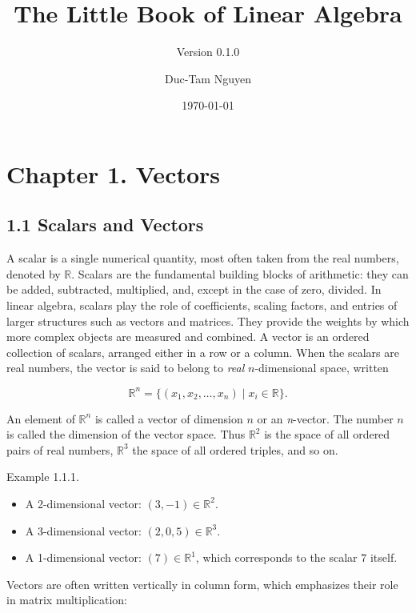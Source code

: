 \documentclass[
  12pt,
  a4paper,
]{article}
\title{The Little Book of Linear Algebra}
\subtitle{Version 0.1.0}
\author{Duc-Tam Nguyen}
\date{\today}
\let\oldsection\section
\renewcommand{\section}{\clearpage\oldsection}
\begin{document}
\maketitle

{
\hypersetup{linkcolor=}
\setcounter{tocdepth}{2}
\tableofcontents
}
\section{Chapter 1. Vectors}\label{chapter-1-vectors}

\subsection{1.1 Scalars and Vectors}\label{11-scalars-and-vectors}

A scalar is a single numerical quantity, most often taken from the real
numbers, denoted by \(\mathbb{R}\). Scalars are the fundamental building
blocks of arithmetic: they can be added, subtracted, multiplied, and,
except in the case of zero, divided. In linear algebra, scalars play the
role of coefficients, scaling factors, and entries of larger structures
such as vectors and matrices. They provide the weights by which more
complex objects are measured and combined. A vector is an ordered
collection of scalars, arranged either in a row or a column. When the
scalars are real numbers, the vector is said to belong to \emph{real}
\(n\)-dimensional space, written

\[\mathbb{R}^n = \{ (x_1, x_2, \dots, x_n) \mid x_i \in \mathbb{R} \}.\]

An element of \(\mathbb{R}^n\) is called a vector of dimension \(n\) or
an \emph{n}-vector. The number \(n\) is called the dimension of the
vector space. Thus \(\mathbb{R}^2\) is the space of all ordered pairs of
real numbers, \(\mathbb{R}^3\) the space of all ordered triples, and so
on.

Example 1.1.1.

\begin{itemize}
\item
  A 2-dimensional vector: \((3, -1) \in \mathbb{R}^2\).
\item
  A 3-dimensional vector: \((2, 0, 5) \in \mathbb{R}^3\).
\item
  A 1-dimensional vector: \((7) \in \mathbb{R}^1\), which corresponds to
  the scalar \(7\) itself.
\end{itemize}

Vectors are often written vertically in column form, which emphasizes
their role in matrix multiplication:
\end{document}
